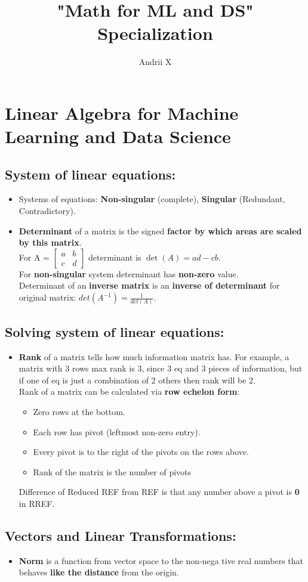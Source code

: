\documentclass[16pt]{article}
\title{"Math for ML and DS" Specialization }
\author{ Andrii X }
\date{}
\begin{document}
	\maketitle
	
	\section{Linear Algebra for Machine Learning and Data Science}
	\subsection{System of linear equations:}
	\begin{itemize}
	\item {Systems of equations: \textbf{Non-singular} (complete), \textbf{Singular} (Redundant, Contradictory).}
	\item {\textbf{Determinant} of a matrix is the signed \textbf{factor by which areas are scaled by this matrix}. 
	\\
	For A = 
	$\begin{bmatrix}
		a & b\\
		c & d
	\end{bmatrix}$ 
	determinant is $\det(A) = ad-cb$. 
	\\
	For \textbf{non-singular} system determinant has \textbf{non-zero} value.
	\\
	Determinant of an \textbf{inverse matrix} is an \textbf{inverse of determinant} for original matrix: 
	$det(A^{-1})=\frac{1}{det(A)}$. 
	}
	\end{itemize}

	\subsection{Solving system of linear equations:}
	\begin{itemize}
	\item {\textbf{Rank} of a matrix tells how much information matrix has. For example, a matrix with 3 rows max rank is 3, since 3 eq and 3 pieces of information, but if one of eq is just a combination of 2 others then rank will be 2.
	\\
	Rank of a matrix can be calculated via \textbf{row echelon form}: 
	\begin{itemize}
		\item Zero rows at the bottom. 
		\item Each row has pivot (leftmost non-zero entry). 
		\item Every pivot is to the right of the pivots on the rows above. 
		\item Rank of the matrix is the number of pivots
	\end{itemize}
	Difference of Reduced REF from REF is that any number above a pivot is \textbf{0} in RREF. 
	}	
	\end{itemize}
	\subsection{Vectors and Linear Transformations:}
	\begin{itemize}
	\item {\textbf{Norm} is a function from vector space to the non-nega tive real numbers that behaves \textbf{like the distance} from the origin.}
	\end{itemize}
	
	
\end{document}
